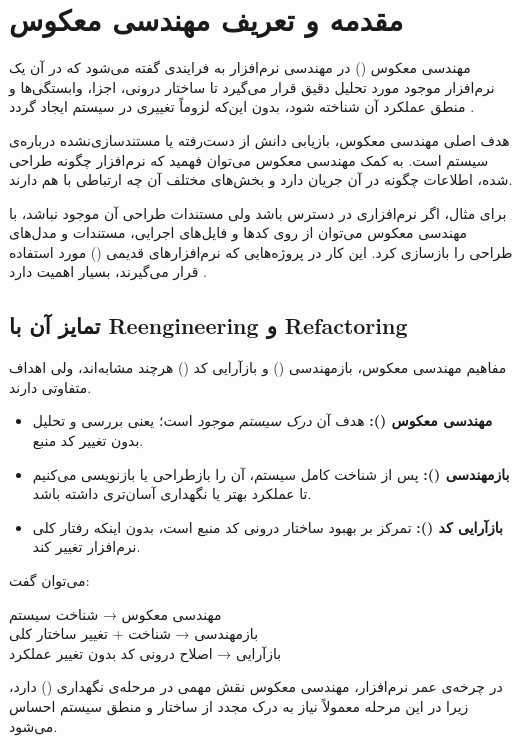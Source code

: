 \section{مقدمه و تعریف مهندسی معکوس}

مهندسی معکوس () در مهندسی نرم‌افزار به فرایندی گفته می‌شود که در آن یک نرم‌افزار موجود مورد تحلیل دقیق قرار می‌گیرد تا ساختار درونی، اجزا، وابستگی‌ها و منطق عملکرد آن شناخته شود، بدون این‌که لزوماً تغییری در سیستم ایجاد گردد \cite{pressman2020software}.

هدف اصلی مهندسی معکوس، بازیابی دانش از دست‌رفته یا مستندسازی‌نشده درباره‌ی سیستم است. به کمک مهندسی معکوس می‌توان فهمید که نرم‌افزار چگونه طراحی شده، اطلاعات چگونه در آن جریان دارد و بخش‌های مختلف آن چه ارتباطی با هم دارند.

برای مثال، اگر نرم‌افزاری در دسترس باشد ولی مستندات طراحی آن موجود نباشد، با مهندسی معکوس می‌توان از روی کدها و فایل‌های اجرایی، مستندات و مدل‌های طراحی را بازسازی کرد. این کار در پروژه‌هایی که نرم‌افزارهای قدیمی () مورد استفاده قرار می‌گیرند، بسیار اهمیت دارد \cite{pressman2020software}.

\subsection{تمایز آن با Reengineering و Refactoring}

مفاهیم مهندسی معکوس، بازمهندسی () و بازآرایی کد () هرچند مشابه‌اند، ولی اهداف متفاوتی دارند.

\begin{itemize}
    \item \textbf{مهندسی معکوس ():} هدف آن \textit{درک سیستم موجود} است؛ یعنی بررسی و تحلیل بدون تغییر کد منبع.
    \item \textbf{بازمهندسی ():} پس از شناخت کامل سیستم، آن را بازطراحی یا بازنویسی می‌کنیم تا عملکرد بهتر یا نگهداری آسان‌تری داشته باشد.
    \item \textbf{بازآرایی کد ():} تمرکز بر بهبود ساختار درونی کد منبع است، بدون اینکه رفتار کلی نرم‌افزار تغییر کند.
\end{itemize}

می‌توان گفت:
\begin{center}
مهندسی معکوس → شناخت سیستم \\
بازمهندسی → شناخت + تغییر ساختار کلی \\
بازآرایی → اصلاح درونی کد بدون تغییر عملکرد
\end{center}

در چرخه‌ی عمر نرم‌افزار، مهندسی معکوس نقش مهمی در مرحله‌ی نگهداری () دارد، زیرا در این مرحله معمولاً نیاز به درک مجدد از ساختار و منطق سیستم احساس می‌شود.
